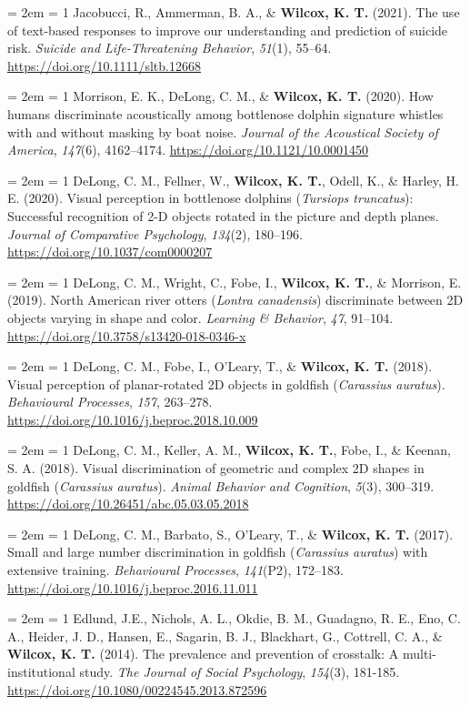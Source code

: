 \documentclass[
  12 pt,
]{article}
\begin{document}
\hangindent = 2em \hangafter = 1 Jacobucci, R., Ammerman, B. A., \&
\textbf{Wilcox, K. T.} (2021). The use of text-based responses to
improve our understanding and prediction of suicide risk. \emph{Suicide
and Life-Threatening Behavior}, \emph{51}(1), 55--64.
\url{https://doi.org/10.1111/sltb.12668}

\hangindent = 2em \hangafter = 1 Morrison, E. K., DeLong, C. M., \&
\textbf{Wilcox, K. T.} (2020). How humans discriminate acoustically
among bottlenose dolphin signature whistles with and without masking by
boat noise. \emph{Journal of the Acoustical Society of America},
\emph{147}(6), 4162--4174. \url{https://doi.org/10.1121/10.0001450}

\hangindent = 2em \hangafter = 1 DeLong, C. M., Fellner, W.,
\textbf{Wilcox, K. T.}, Odell, K., \& Harley, H. E. (2020). Visual
perception in bottlenose dolphins (\emph{Tursiops truncatus}):
Successful recognition of 2-D objects rotated in the picture and depth
planes. \emph{Journal of Comparative Psychology}, \emph{134}(2),
180--196. \url{https://doi.org/10.1037/com0000207}

\hangindent = 2em \hangafter = 1 DeLong, C. M., Wright, C., Fobe, I.,
\textbf{Wilcox, K. T.}, \& Morrison, E. (2019). North American river
otters (\emph{Lontra canadensis}) discriminate between 2D objects
varying in shape and color. \emph{Learning \& Behavior}, \emph{47},
91--104. \url{https://doi.org/10.3758/s13420-018-0346-x}

\hangindent = 2em \hangafter = 1 DeLong, C. M., Fobe, I., O'Leary, T.,
\& \textbf{Wilcox, K. T.} (2018). Visual perception of planar-rotated 2D
objects in goldfish (\emph{Carassius auratus}). \emph{Behavioural
Processes}, \emph{157}, 263--278.
\url{https://doi.org/10.1016/j.beproc.2018.10.009}

\hangindent = 2em \hangafter = 1 DeLong, C. M., Keller, A. M.,
\textbf{Wilcox, K. T.}, Fobe, I., \& Keenan, S. A. (2018). Visual
discrimination of geometric and complex 2D shapes in goldfish
(\emph{Carassius auratus}). \emph{Animal Behavior and Cognition},
\emph{5}(3), 300--319. \url{https://doi.org/10.26451/abc.05.03.05.2018}

\hangindent = 2em \hangafter = 1 DeLong, C. M., Barbato, S., O'Leary,
T., \& \textbf{Wilcox, K. T.} (2017). Small and large number
discrimination in goldfish (\emph{Carassius auratus}) with extensive
training. \emph{Behavioural Processes}, \emph{141}(P2), 172--183.
\url{https://doi.org/10.1016/j.beproc.2016.11.011}

\hangindent = 2em \hangafter = 1 Edlund, J.E., Nichols, A. L., Okdie, B.
M., Guadagno, R. E., Eno, C. A., Heider, J. D., Hansen, E., Sagarin, B.
J., Blackhart, G., Cottrell, C. A., \& \textbf{Wilcox, K. T.} (2014).
The prevalence and prevention of crosstalk: A multi-institutional study.
\emph{The Journal of Social Psychology}, \emph{154}(3), 181-185.
\url{https://doi.org/10.1080/00224545.2013.872596}
\end{document}
